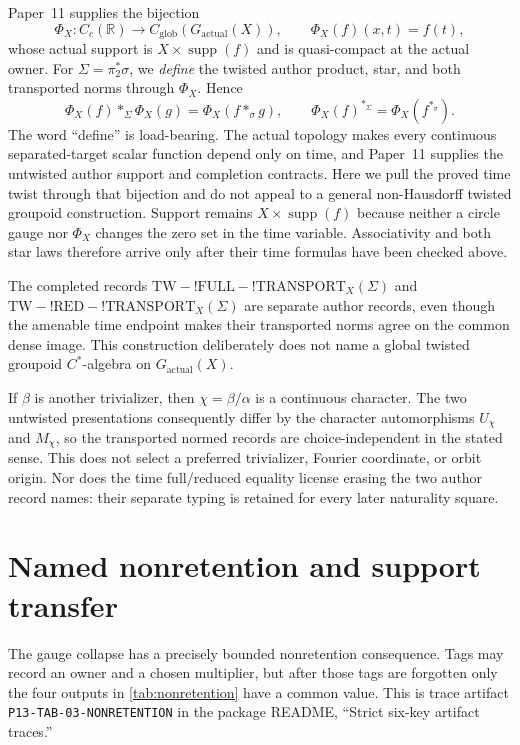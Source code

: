 \documentclass[11pt]{article}
\theoremstyle{definition}
\newcommand{\R}{\mathbb R}
\newcommand{\Gactual}{G_{\mathrm{actual}}}
\newcommand{\supp}{\operatorname{supp}}
\begin{document}
Paper~11 supplies the bijection
\[
 \Phi_X:C_c(\R)\longrightarrow C_{\mathrm{glob}}(\Gactual(X)),
 \qquad \Phi_X(f)(x,t)=f(t),
\]
whose actual support is $X\times\supp(f)$ and is quasi-compact at the actual
owner.  For $\Sigma=\pi_2^*\sigma$, we \emph{define} the twisted author
product, star, and both transported norms through $\Phi_X$.  Hence
\[
 \Phi_X(f)*_\Sigma\Phi_X(g)=\Phi_X(f*_{\sigma}g),
 \qquad
 \Phi_X(f)^{*_{\Sigma}}=\Phi_X(f^{*_{\sigma}}).
\]
The word ``define'' is load-bearing.  The actual topology makes every
continuous separated-target scalar function depend only on time, and
Paper~11 supplies the untwisted author support and completion contracts.
Here we pull the proved time twist through that bijection and do not appeal
to a general non-Hausdorff twisted groupoid construction.  Support remains
$X\times\supp(f)$ because neither a circle gauge nor $\Phi_X$ changes the
zero set in the time variable.  Associativity and both star laws therefore
arrive only after their time formulas have been checked above.

The completed records
$\mathrm{TW\!-!FULL\!-!TRANSPORT}_X(\Sigma)$ and
$\mathrm{TW\!-!RED\!-!TRANSPORT}_X(\Sigma)$ are separate author records,
even though the amenable time endpoint makes their transported norms agree
on the common dense image.  This construction deliberately does not name a
global twisted groupoid $C^*$-algebra on $\Gactual(X)$.

If $\beta$ is another trivializer, then $\chi=\beta/\alpha$ is a continuous
character.  The two untwisted presentations consequently differ by the
character automorphisms $U_\chi$ and $M_\chi$, so the transported normed
records are choice-independent in the stated sense.  This does not select a
preferred trivializer, Fourier coordinate, or orbit origin.  Nor does the
time full/reduced equality license erasing the two author record names: their
separate typing is retained for every later naturality square.

\section{Named nonretention and support transfer}\label{sec:support}

The gauge collapse has a precisely bounded nonretention consequence.  Tags
may record an owner and a chosen multiplier, but after those tags are
forgotten only the four outputs in \cref{tab:nonretention} have a common
value.  This is trace artifact \nolinkurl{P13-TAB-03-NONRETENTION} in the
package README, ``Strict six-key artifact traces.''
\end{document}
